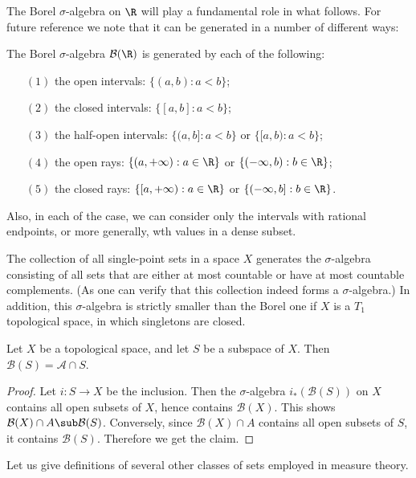 The Borel $\sigma$-algebra on $\R$ will play a fundamental role in what follows. For future reference we note that it can be generated in a number of different ways:
\begin{proposition}
The Borel $\sigma$-algebra $\mathcal{B}(\R)$ is generated by each of the following:
\begin{itemize}
\item[$(1)$] the open intervals: $\{(a,b):a<b\}$;
\item[$(2)$] the closed intervals: $\{[a,b]:a<b\}$;
\item[$(3)$] the half-open intervals: $\{(a,b]:a<b\}$ or $\{[a,b):a<b\}$;
\item[$(4)$] the open rays: $\{(a,+\infty):a\in\R\}$ or $\{(-\infty,b):b\in\R\}$;
\item[$(5)$] the closed rays: $\{[a,+\infty):a\in\R\}$ or $\{(-\infty,b]:b\in\R\}$.
\end{itemize}
Also, in each of the case, we can consider only the intervals with rational endpoints, or more generally, wth values in a dense subset. 
\end{proposition}
\begin{example}
The collection of all single-point sets in a space $X$ generates the $\sigma$-algebra consisting of all sets that are either at most countable or have at most countable complements. (As one can verify that this collection indeed forms a $\sigma$-algebra.) In addition, this $\sigma$-algebra is strictly smaller than the Borel one if $X$ is a $T_1$ topological space, in which singletons are closed.
\end{example}
\begin{proposition}\label{Borel algebra subspace}
Let $X$ be a topological space, and let $S$ be a subspace of $X$. Then $\mathcal{B}(S)=\mathcal{A}\cap S$.
\end{proposition}
\begin{proof}
Let $i:S\to X$ be the inclusion. Then the $\sigma$-algebra $i_*(\mathcal{B}(S))$ on $X$ contains all open subsets of $X$, hence contains $\mathcal{B}(X)$. This shows $\mathcal{B}(X)\cap A\sub\mathcal{B}(S)$. Conversely, since $\mathcal{B}(X)\cap A$ contains all open subsets of $S$, it contains $\mathcal{B}(S)$. Therefore we get the claim.
\end{proof}
Let us give definitions of several other classes of sets employed in measure theory.
